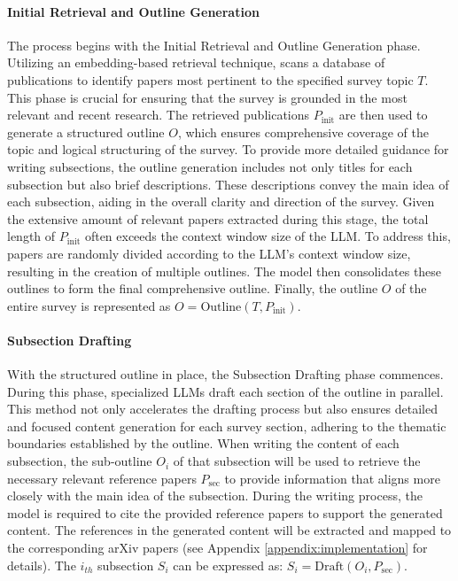 \paragraph{Initial Retrieval and Outline Generation}
The process begins with the Initial Retrieval and Outline Generation phase. Utilizing an embedding-based retrieval technique, \ourmethod scans a database of publications to identify papers most pertinent to the specified survey topic \(T\). This phase is crucial for ensuring that the survey is grounded in the most relevant and recent research. The retrieved publications \(P_{\text{init}}\) are then used to generate a structured outline \(O\), which ensures comprehensive coverage of the topic and logical structuring of the survey. To provide more detailed guidance for writing subsections, the outline generation includes not only titles for each subsection but also brief descriptions. These descriptions convey the main idea of each subsection, aiding in the overall clarity and direction of the survey. Given the extensive amount of relevant papers extracted during this stage, the total length of \(P_{\text{init}}\) often exceeds the context window size of the LLM. To address this, papers are randomly divided according to the LLM's context window size, resulting in the creation of multiple outlines. The model then consolidates these outlines to form the final comprehensive outline. Finally, the outline \(O\) of the entire survey is represented as $O = \text{Outline}(T, P_{\text{init}}).$

\paragraph{Subsection Drafting}
With the structured outline in place, the Subsection Drafting phase commences. During this phase, specialized LLMs draft each section of the outline in parallel. This method not only accelerates the drafting process but also ensures detailed and focused content generation for each survey section, adhering to the thematic boundaries established by the outline. When writing the content of each subsection, the sub-outline \(O_i\) of that subsection will be used to retrieve the necessary relevant reference papers \(P_{\text{sec}}\) to provide information that aligns more closely with the main idea of the subsection. During the writing process, the model is required to cite the provided reference papers to support the generated content. The references in the generated content will be extracted and mapped to the corresponding arXiv papers (see Appendix \ref{appendix:implementation} for details). The \(i_{th}\) subsection \(S_i\) can be expressed as: $S_i = \text{Draft}(O_i, P_{\text{sec}}).$

